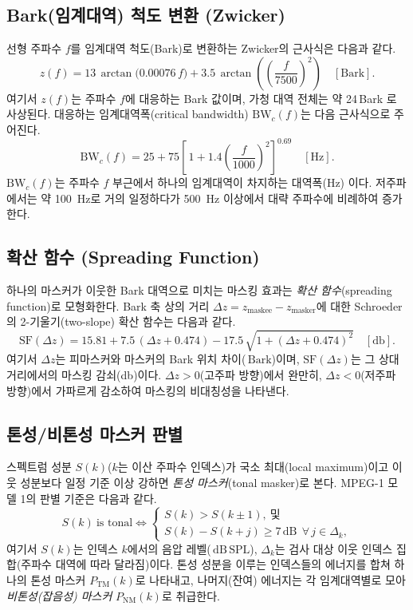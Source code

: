 \documentclass[11pt,a4paper]{article}
\newcommand{\dB}{\ensuremath{\,\mathrm{dB}}}          %
\newcommand{\dBSPL}{\ensuremath{\,\mathrm{dB\,SPL}}}  %
\newcommand{\Bark}{\ensuremath{\,\mathrm{Bark}}}      %
\newcommand{\dz}{\Delta z}                             %
\DeclareMathOperator{\arctanop}{arctan}
\begin{document}
\subsection{Bark(임계대역) 척도 변환 (Zwicker)}
선형 주파수 $f$를 임계대역 척도(Bark)로 변환하는 Zwicker의 근사식은 다음과 같다.
\begin{equation}\label{eq:bark}
  z(f) = 13\,\arctanop\!\bigl(0.00076\, f\bigr)
       + 3.5\,\arctanop\!\left(\left(\frac{f}{7500}\right)^{2}\right)
  \quad [\mathrm{Bark}].
\end{equation}
여기서 $z(f)$는 주파수 $f$에 대응하는 Bark 값이며, 가청 대역 전체는 약 24\,Bark 로
사상된다. 대응하는 임계대역폭(critical bandwidth) $\mathrm{BW}_{c}(f)$는 다음
근사식으로 주어진다.
\begin{equation}\label{eq:cbw}
  \mathrm{BW}_{c}(f) = 25 + 75\left[\,1 + 1.4\left(\frac{f}{1000}\right)^{2}\right]^{0.69}
  \quad [\si{\hertz}].
\end{equation}
$\mathrm{BW}_{c}(f)$는 주파수 $f$ 부근에서 하나의 임계대역이 차지하는 대역폭(\si{\hertz})
이다. 저주파에서는 약 \SI{100}{\hertz}로 거의 일정하다가 \SI{500}{\hertz} 이상에서 대략
주파수에 비례하여 증가한다.

\subsection{확산 함수 (Spreading Function)}
하나의 마스커가 이웃한 Bark 대역으로 미치는 마스킹 효과는 \emph{확산
함수}(spreading function)로 모형화한다. Bark 축 상의 거리
$\dz = z_{\text{maskee}} - z_{\text{masker}}$에 대한 Schroeder의 2-기울기(two-slope)
확산 함수는 다음과 같다.
\begin{equation}\label{eq:spread}
  \mathrm{SF}(\dz) = 15.81 + 7.5\,(\dz + 0.474)
                   - 17.5\,\sqrt{1 + (\dz + 0.474)^{2}}
  \quad [\si{\decibel}].
\end{equation}
여기서 $\dz$는 피마스커와 마스커의 Bark 위치 차이(\Bark)이며, $\mathrm{SF}(\dz)$는
그 상대 거리에서의 마스킹 감쇠(\si{\decibel})이다. $\dz>0$(고주파 방향)에서 완만히,
$\dz<0$(저주파 방향)에서 가파르게 감소하여 마스킹의 비대칭성을 나타낸다.

\subsection{톤성/비톤성 마스커 판별}
스펙트럼 성분 $S(k)$($k$는 이산 주파수 인덱스)가 국소 최대(local maximum)이고 이웃
성분보다 일정 기준 이상 강하면 \emph{톤성 마스커}(tonal masker)로 본다. MPEG-1 모델
1의 판별 기준은 다음과 같다.
\begin{equation}\label{eq:tonal}
  S(k)\ \text{is tonal} \iff
  \begin{cases}
    S(k) > S(k\pm 1), \ \text{및}\\[2pt]
    S(k) - S(k+j) \ge 7\dB \ \ \forall\, j \in \Delta_{k},
  \end{cases}
\end{equation}
여기서 $S(k)$는 인덱스 $k$에서의 음압 레벨(\dBSPL), $\Delta_{k}$는 검사 대상 이웃
인덱스 집합(주파수 대역에 따라 달라짐)이다. 톤성 성분을 이루는 인덱스들의 에너지를
합쳐 하나의 톤성 마스커 $P_{\mathrm{TM}}(k)$로 나타내고, 나머지(잔여) 에너지는 각
임계대역별로 모아 \emph{비톤성(잡음성) 마스커} $P_{\mathrm{NM}}(k)$로 취급한다.
\end{document}
